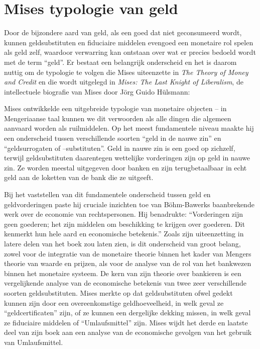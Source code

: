\hypertarget{mises-typologie-van-geld}{%
\section{Mises\textquotesingle{} typologie van geld}\label{mises-typologie-van-geld}}

Door de bijzondere aard van geld, als een goed dat niet geconsumeerd wordt, kunnen geldsubstituten en fiduciaire middelen evengoed een monetaire rol spelen als geld zelf, waardoor verwarring kan ontstaan over wat er precies bedoeld wordt met de term ``geld''. Er bestaat een belangrijk onderscheid en het is daarom nuttig om de typologie te volgen die Mises uiteenzette in \emph{The Theory of Money and Credit} en die wordt uitgelegd in \emph{Mises: The Last Knight of Liberalism},\autocite{169} de intellectuele biografie van Mises door Jörg Guido Hülsmann:

\begin{blockquotebox}
    Mises ontwikkelde een uitgebreide typologie van monetaire objecten -- in Mengeriaanse taal kunnen we dit verwoorden als alle dingen die algemeen aanvaard worden als ruilmiddelen. Op het meest fundamentele niveau maakte hij een onderscheid tussen verschillende soorten ``geld in de nauwe zin'' en ``geldsurrogaten of --substituten''. Geld in nauwe zin is een goed op zichzelf, terwijl geldsubstituten daarentegen wettelijke vorderingen zijn op geld in nauwe zin. Ze worden meestal uitgegeven door banken en zijn terugbetaalbaar in echt geld aan de loketten van de bank die ze uitgeeft.
    \par\vspace{1em}\noindent
    Bij het vaststellen van dit fundamentele onderscheid tussen geld en geldvorderingen paste hij cruciale inzichten toe van Böhm-Bawerk\textquotesingle s baanbrekende werk over de economie van rechtspersonen. Hij benadrukte: ``Vorderingen zijn geen goederen; het zijn middelen om beschikking te krijgen over goederen. Dit kenmerkt hun hele aard en economische betekenis.'' Zoals zijn uiteenzetting in latere delen van het boek zou laten zien, is dit onderscheid van groot belang, zowel voor de integratie van de monetaire theorie binnen het kader van Mengers theorie van waarde en prijzen, als voor de analyse van de rol van het bankwezen binnen het monetaire systeem. De kern van zijn theorie over bankieren is een vergelijkende analyse van de economische betekenis van twee zeer verschillende soorten geldsubstituten. Mises merkte op dat geldsubstituten ofwel gedekt kunnen zijn door een overeenkomstige geldhoeveelheid, in welk geval ze ``geldcertificaten'' zijn, of ze kunnen een dergelijke dekking missen, in welk geval ze fiduciaire middelen of ``Umlaufsmittel'' zijn. Mises wijdt het derde en laatste deel van zijn boek aan een analyse van de economische gevolgen van het gebruik van Umlaufsmittel.\footnotemark
\end{blockquotebox}
\autocite{170}

